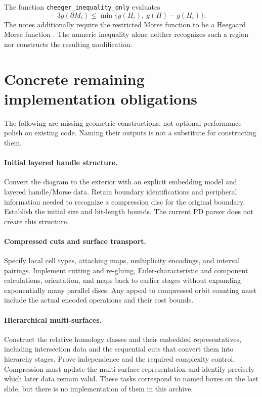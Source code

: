 \documentclass[11pt]{article}
\theoremstyle{remark}\newtheorem{remark}[theorem]{Remark}
\newcommand{\code}[1]{\texttt{#1}}
\begin{document}
The function \code{cheeger\_inequality\_only} evaluates
\[
 3g(\partial M_i)\leq
 \min\{g(H_i),\ g(H)-g(H_i)\}.
\]
The notes additionally require the restricted Morse function to be a Heegaard
Morse function \cite[p.~108]{notes}. The numeric inequality alone neither
recognizes such a region nor constructs the resulting modification.

\section{Concrete remaining implementation obligations}
\label{sec:missing}

The following are missing geometric constructions, not optional performance
polish on existing code. Naming their outputs is not a substitute for
constructing them.

\paragraph{Initial layered handle structure.}
Convert the diagram to the exterior with an explicit embedding model and
layered handle/Morse data. Retain boundary identifications and peripheral
information needed to recognize a compression disc for the original boundary.
Establish the initial size and bit-length bounds. The current PD parser does
not create this structure.

\paragraph{Compressed cuts and surface transport.}
Specify local cell types, attaching maps, multiplicity encodings, and interval
pairings. Implement cutting and re-gluing, Euler-characteristic and component
calculations, orientation, and maps back to earlier stages without expanding
exponentially many parallel discs. Any appeal to compressed orbit counting
must include the actual encoded operations and their cost bounds.

\paragraph{Hierarchical multi-surfaces.}
Construct the relative homology classes and their embedded representatives,
including intersection data and the sequential cuts that convert them into
hierarchy stages. Prove independence and the required complexity control.
Compression must update the multi-surface representation and identify precisely
which later data remain valid. These tasks correspond to named boxes on the
last slide, but there is no implementation of them in this archive.
\end{document}
